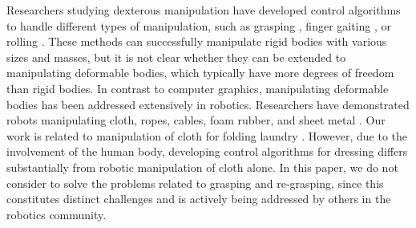 


Researchers studying dexterous manipulation have developed control algorithms to handle different types of manipulation, such as grasping \cite{Pollard:2005:PBG,Kry:2006:ICS,Wang:2013:VHM,Zhao:2013:RRP}, finger gaiting \cite{Ye:2012:SDH}, or rolling \cite{Bai:2014:DMU}. These methods can successfully manipulate rigid bodies with various sizes and masses, but it is not clear whether they can be extended to manipulating deformable bodies, which typically have more degrees of freedom than rigid bodies. In contrast to computer graphics, manipulating deformable bodies has been addressed extensively in robotics. Researchers have demonstrated robots manipulating cloth, ropes, cables, foam rubber, and sheet metal \cite{Kosuge:1995:MFO,Wu:1995:AHC,Fahantidis:1997:RHF,Osawa:2007:UML,Cusumano:2011:BCD,Bersch:2011:BRC,Miller:2012:GAR}. Our work is related to manipulation of cloth for folding laundry \cite{Osawa:2007:UML,Cusumano:2011:BCD,Bersch:2011:BRC,Miller:2012:GAR}. However, due to the involvement of the human body, developing control algorithms for dressing differs substantially from robotic manipulation of cloth alone. In this paper, we do not consider to solve the problems related to grasping and re-grasping, since this constitutes distinct challenges and is actively being addressed by others in the robotics community.



